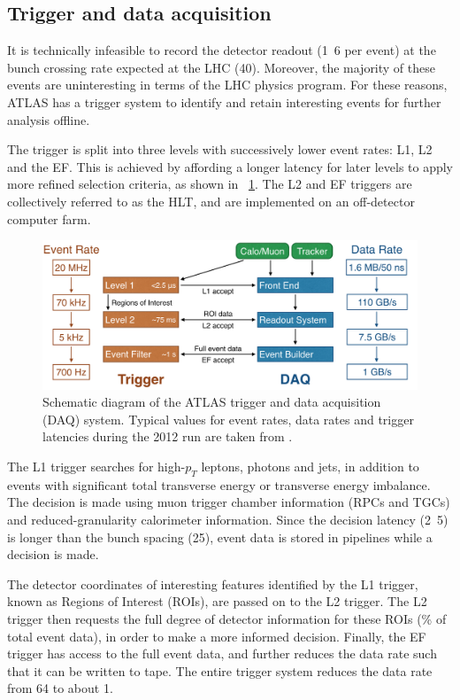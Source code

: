 \subsection{Trigger and data acquisition}
\label{sec:atlas:trig}

It is technically infeasible to record the detector readout (\unit{1.6}{\mega\bel} per 
event) at the bunch crossing rate expected at the \ac{LHC} (\unit{40}{\mega\hertz}).
Moreover, the majority of these events are uninteresting in terms of the \ac{LHC} physics 
program. For these reasons, ATLAS has a trigger system to identify and retain interesting
events for further analysis offline.

The trigger is split into three levels with successively lower event rates: \ac{L1}, 
\ac{L2} and the \ac{EF}. This is achieved by affording a longer latency for later levels 
to apply more refined selection criteria, as shown in \Figure~\ref{fig:trigger}. The 
\ac{L2} and \ac{EF} triggers are collectively referred to as the \ac{HLT}, and are 
implemented on an off-detector computer farm.
\begin{figure}[b]
	\includegraphics[width=\textwidth]{tex/experiment/trigger}
	\caption{Schematic diagram of the ATLAS trigger and data acquisition (DAQ) system.
	Typical values for event rates, data rates and trigger latencies during the 2012 run 
	are taken from \cite{TriggerNumbers}.}
	\label{fig:trigger}
\end{figure}

The \ac{L1} trigger searches for high-$p_T$ leptons, photons and jets, in addition to 
events with significant total transverse energy or transverse energy imbalance. The 
decision is made using muon trigger chamber information (\acp{RPC} and \acp{TGC}) and 
reduced-granularity calorimeter information. Since the decision latency 
(\unit{2.5}{\micro\second}) is longer than the bunch spacing (\unit{25}{\nano\second}),
event data is stored in pipelines while a decision is made.

The detector coordinates of interesting features identified by the \ac{L1} trigger, known 
as Regions of Interest (ROIs), are passed on to the \ac{L2} trigger. The \ac{L2} trigger 
then requests the full degree of detector information for these ROIs (\% of total
event data), in order to make a more informed decision. Finally, the \ac{EF} trigger has
access to the full event data, and further reduces the data rate such that it can be 
written to tape. The entire trigger system reduces the data rate from 
\unit{64}{\tera\bel\per\second} to about \unit{1}{\giga\bel\per\second}.



